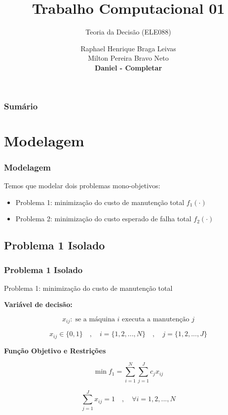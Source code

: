 \documentclass{beamer}
\title[Short Paper Title]  
{Trabalho Computacional 01}
\subtitle
{Teoria da Decisão (ELE088)}
\author 
 { Raphael Henrique Braga Leivas \\
 Milton Pereira Bravo Neto \\ 
 \textbf{Daniel - Completar}}
\institute 
{
Curso de Bacharelado em Engenharia de Sistemas\\
Universidade Federal de Minas Gerais
}
\date{}
\newcommand{\un}[1]{\;\text{#1}}
\begin{document}
\begin{frame}
    \titlepage
\end{frame}

\begin{frame}
    \frametitle{Sumário}
    \tableofcontents
\end{frame}

\section{Modelagem}

    \begin{frame}
        \frametitle{Modelagem}
        Temos que modelar dois problemas mono-objetivos:
        \vspace{1cm}

        \begin{itemize}
            \item Problema 1: minimização do custo de manutenção total $f_1 (\cdot)$
             \vspace{1cm}
            \item Problema 2: minimização do custo esperado de falha total $f_2 (\cdot)$
        \end{itemize}
    \end{frame}

    \subsection{Problema 1 Isolado}
    \begin{frame}
        \frametitle{Problema 1 Isolado}

        \begin{center}
            Problema 1: minimização do custo de manutenção total
        \end{center}

        \vspace{0.5cm}

        \textbf{Variável de decisão:}

        \[  x_{ij}: \un{se a máquina $i$ executa a manutenção $j$}  \]
        
        \[ x_{ij} \in \{0,1\} \quad , \quad i = \{1, 2, ..., N\}  \quad , \quad j = \{1, 2, ..., J\} \]

        \vspace{0.5cm}

        \textbf{Função Objetivo e Restrições}

        \[  \min f_1 = \sum_{i=1}^{N} \sum_{j=1}^{J} c_j x_{ij} \]

        \[ \sum_{j=1}^{J} x_{ij} = 1 \quad , \quad \forall i = {1, 2, ..., N} \]
    \end{frame}
\end{document}
